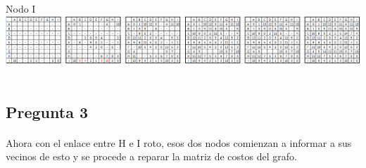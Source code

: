 \documentclass[paper=a4, fontsize=11pt]{scrartcl}
\numberwithin{equation}{section}		%
\numberwithin{figure}{section}			%
\numberwithin{table}{section}				%
\begin{document}
Nodo I
\includegraphics[width=1\textwidth]{2i.png}\\\\




\subsection*{Pregunta 3}
\paragraph{} \hspace{0pt}

Ahora con el enlace entre H e I roto, esos dos nodos comienzan a informar a sus vecinos de esto y se procede a reparar la matriz de costos del grafo.\\
\end{document}
